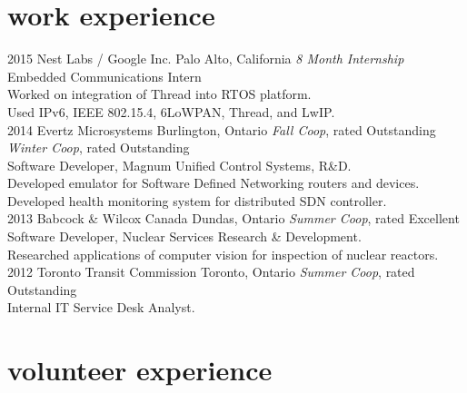 \documentclass[]{eliot-cv} %
\begin{document}
\section{work experience}

\begin{entrylist}


\entry
{2015}
{Nest Labs / Google Inc.}
{Palo Alto, California}
{\emph{8 Month Internship} \\
Embedded Communications Intern \\
Worked on integration of Thread into RTOS platform. \\
Used IPv6, IEEE 802.15.4, 6LoWPAN, Thread, and LwIP. \\}
\entry
{2014}
{Evertz Microsystems}
{Burlington, Ontario}
{\emph{Fall Co\-op}, rated Outstanding \\
\emph{Winter Co\-op}, rated Outstanding \\
Software Developer, Magnum Unified Control Systems, R\&D. \\
Developed emulator for Software Defined Networking routers and devices. \\
Developed health monitoring system for distributed SDN controller. \\}
\entry
{2013}
{Babcock \& Wilcox Canada}
{Dundas, Ontario}
{\emph{Summer Co\-op}, rated Excellent \\
Software Developer, Nuclear Services Research \& Development. \\
Researched applications of computer vision for inspection of nuclear reactors. \\}
\entry
{2012}
{Toronto Transit Commission}
{Toronto, Ontario}
{\emph{Summer Co\-op}, rated Outstanding \\
Internal IT Service Desk Analyst.}

\end{entrylist}

\section{volunteer experience}
\end{document}
